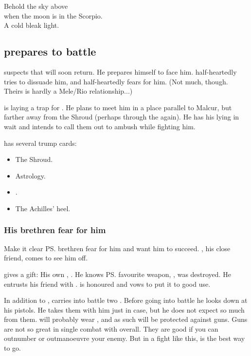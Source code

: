 \begin{garbage}
{  Behold the sky above \\
  when the moon is in the Scorpio.\\
  A cold bleak light. 
}









\subsection{\Teshrial{} prepares to battle \Ishnaruchaefir}
\Teshrial{} suspects that \Ishnaruchaefir{} will soon return. He prepares himself to face him. \Achsah{} half-heartedly tries to dissuade him, and half-heartedly fears for him. 
(Not much, though. Theirs is hardly a Mele/Rio relationship...)

\Teshrial{} is laying a trap for \Ishnaruchaefir. 
He plans to meet him in a place parallel to Malcur, but farther away from the Shroud (perhaps through the  again). 
He has his \ghobaleth{} lying in wait and intends to call them out to ambush \Ishnaruchaefir{} while fighting him. 

\Teshrial{} has several trump cards:
\begin{itemize}
  \item The Shroud.
  \item Astrology. 
  \item \Ghobaleth.
  \item The Achilles' heel. 
\end{itemize}





\subsubsection{His brethren fear for him}
Make it clear \ps{\Teshrial} brethren fear for him and want him to succeed. 
\Menessiaraid, his close friend, comes to see him off. 

\Menessiaraid{} gives \Teshrial{} a gift: 
His own \senaan, \hs{\Ossiraith}. 
He knows \ps{\Teshrial} favourite weapon, \hs{\Turishah}, was destroyed. 
He entrusts his friend with \Ossiraith. 
\Teshrial{} is honoured and vows to put it to good use. 

In addition to \Ossiraith, \Teshrial{} carries into battle two . 
Before going into battle he looks down at his pistols. 
He takes them with him just in case, but he does not expect so much from them. 
\Ishnaruchaefir{} will probably wear , and as such will be protected against guns. 
Guns are not so great in single combat with \dragons{} overall.
They are good if you can outnumber or outmanoeuvre your enemy. 
But in a fight like this, \melee{} is the best way to go. 






\end{garbage}
